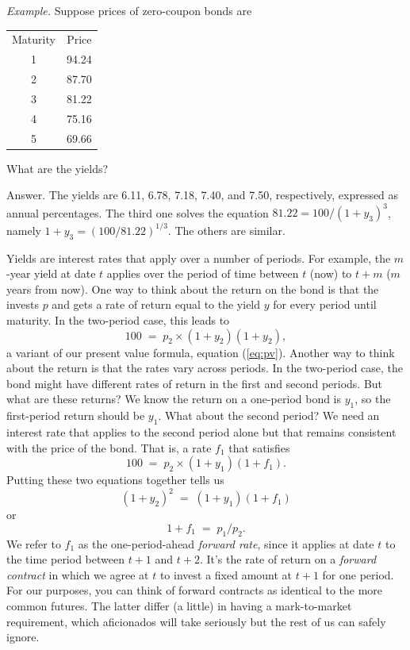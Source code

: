 \documentclass[letterpaper,12pt]{article}
\begin{document}
{\em Example.} Suppose prices of zero-coupon bonds are
%
\begin{center}
\begin{tabular}{cc}
               Maturity        &     Price         \\
                1              &      94.24        \\
                2              &      87.70        \\
                3              &      81.22        \\
                4              &      75.16        \\
                5              &      69.66
\end{tabular}
\end{center}
%
What are the yields?

Answer.  The yields are 6.11, 6.78, 7.18, 7.40, and 7.50,
respectively, expressed as annual percentages.  The third one
solves the equation $ 81.22 = 100/(1+y_3)^3 $, namely $ 1 + y_3 =
(100/81.22)^{1/3} $.  The others are similar.


Yields are interest rates that apply over a number of periods. For
example, the $m$-year yield at date $t$ applies over the period of
time between $t$ (now) to $t+m$ ($m$ years from now).  One way to
think about the return on the bond is that the invests $p$ and
gets a rate of return equal to the yield $y$ for every period
until maturity.  In the two-period case, this leads to
\[
    100 \;=\; p_2 \times (1+y_2) (1+y_2) ,
\]
a variant of our present value formula, equation (\ref{eq:pv}).
Another way to think about the return is that the rates vary
across periods. In the two-period case, the bond might have
different rates of return in the first and second periods. But
what are these returns?  We know the return on a one-period bond
is $y_1$, so the first-period return should be $y_1$.  What about
the second period?  We need an interest rate that applies to the
second period alone but that remains consistent with the price of
the bond. That is, a rate $f_1$ that satisfies
\[
    100 \;=\; p_2 \times (1+y_1) (1+f_1) .
\]
Putting these two equations together tells us
\[
    (1+y_2)^2 \;=\; (1+y_1) (1+f_1)
\]
or
\[
    1+f_1 \;=\; p_1/p_2 .
\]
We refer to $f_1$ as the one-period-ahead {\it forward rate\/},
since it applies at date $t$ to the time period between $t+1$ and
$t+2$. It's the rate of return on a {\it forward contract\/} in
which we agree at $t$ to invest a fixed amount at $t+1$ for one
period.
For our purposes, you can think of forward contracts
as identical to the more common futures.
The latter differ (a little) in having a mark-to-market requirement,
which aficionados will take seriously but the rest of us can safely
ignore.
\end{document}
